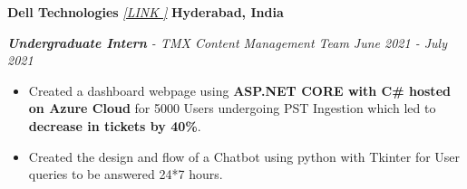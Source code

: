 \textbf{Dell Technologies}
\href{https://drive.google.com/drive/folders/1kFCFK5v2CQWsFT_tSojydJaBIECj3IwS?usp=sharing}{\textit{[LINK {\faExternalLinkSquare}]}}
\hfill  {\faMapMarker} \textbf{{Hyderabad, India}} \par
\textit{\textbf{Undergraduate Intern} - TMX Content Management Team \hfill {\faCalendar} June 2021 - July 2021} \par

\begin{itemize}
	\item Created a dashboard webpage using \textbf{ASP.NET CORE with C\# hosted on Azure Cloud} for 5000 Users undergoing PST Ingestion which led to \textbf{decrease in tickets by 40\%}.
	\item Created the design and flow of a Chatbot using python with Tkinter for User queries to be answered 24*7 hours. 
\end{itemize}\vspace{0.1cm} \par

